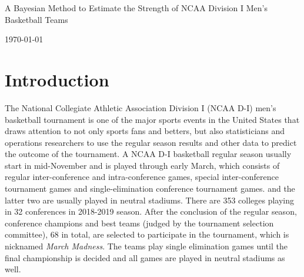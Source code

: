 \documentclass[11pt]{article}
\newcommand{\ms}{\medskip}
\begin{document}
\baselineskip0.25in

\begin{center}
\begin{large}
\begin{bf}

A Bayesian Method to Estimate the Strength of NCAA Division I Men's Basketball Teams \ms

\today \ms
\end{bf}
\end{large}
\end{center}

\section{Introduction}
	The National Collegiate Athletic Association Division I (NCAA D-I) men’s basketball tournament is one of the major sports events in the United States that draws attention to not only sports fans and betters, but also statisticians and operations researchers to use the regular season results and other data to predict the outcome of the tournament. A NCAA D-I basketball regular season usually start in mid-November and is played through early March, which consists of regular inter-conference and intra-conference games, special inter-conference tournament games and single-elimination conference tournament games. and the latter two are usually played in neutral stadiums. There are 353 colleges playing in 32 conferences in 2018-2019 season. After the conclusion of the regular season, conference champions and best teams (judged by the tournament selection committee), 68 in total, are selected to participate in the tournament, which is nicknamed \emph{March Madness}. The teams play single elimination games until the final championship is decided and all games are played in neutral stadiums as well.\\
	\newline
\end{document}
